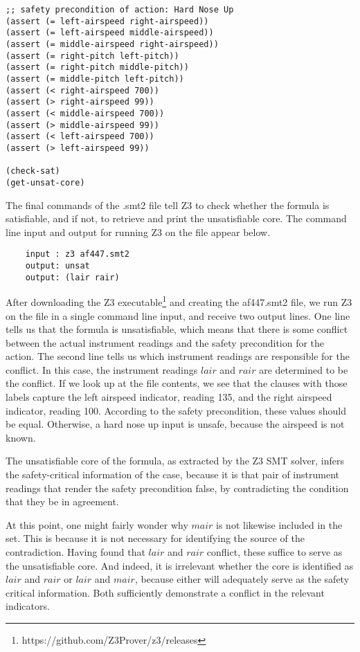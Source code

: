 \begin{tcolorbox}
	\begin{lstlisting}
;; safety precondition of action: Hard Nose Up
(assert (= left-airspeed right-airspeed))
(assert (= left-airspeed middle-airspeed))
(assert (= middle-airspeed right-airspeed))
(assert (= right-pitch left-pitch))
(assert (= right-pitch middle-pitch))
(assert (= middle-pitch left-pitch))
(assert (< right-airspeed 700))
(assert (> right-airspeed 99))
(assert (< middle-airspeed 700))
(assert (> middle-airspeed 99))
(assert (< left-airspeed 700))
(assert (> left-airspeed 99))

(check-sat)
(get-unsat-core)

\end{lstlisting}
\end{tcolorbox}
The final commands of the .smt2 file tell Z3 to check whether the formula is satisfiable, and if not, to retrieve and print the unsatisfiable core. The command line input and output for running Z3 on the file appear below.
\noindent
\begin{tcolorbox}
	\begin{lstlisting}
	input : z3 af447.smt2
	output: unsat
	output: (lair rair)
	\end{lstlisting}
\end{tcolorbox}
\noindent
After downloading the Z3 executable\footnote{https://github.com/Z3Prover/z3/releases} and creating the af447.smt2 file, we run Z3 on the file in a single command line input, and receive two output lines. One line tells us that the formula is unsatisfiable, which means that there is some conflict between the actual instrument readings and the safety precondition for the action. The second line tells us which instrument readings are responsible for the conflict. In this case, the instrument readings $lair$ and $rair$ are determined to be the conflict. If we look up at the file contents, we see that the clauses with those labels capture the left airspeed indicator, reading 135, and the right airspeed indicator, reading 100. According to the safety precondition, these values should be equal. Otherwise, a hard nose up input is unsafe, because the airspeed is not known. 

The unsatisfiable core of the formula, as extracted by the Z3 SMT solver, infers the safety-critical information of the case, because it is that pair of instrument readings that render the safety precondition false, by contradicting the condition that they be in agreement.

At this point, one might fairly wonder why $mair$ is not likewise included in the set. This is because it is not necessary for identifying the source of the contradiction. Having found that $lair$ and $rair$ conflict, these suffice to serve as the unsatisfiable core. And indeed, it is irrelevant whether the core is identified as $lair$ and $rair$ or $lair$ and $mair$, because either will adequately serve as the safety critical information. Both sufficiently demonstrate a conflict in the relevant indicators.

